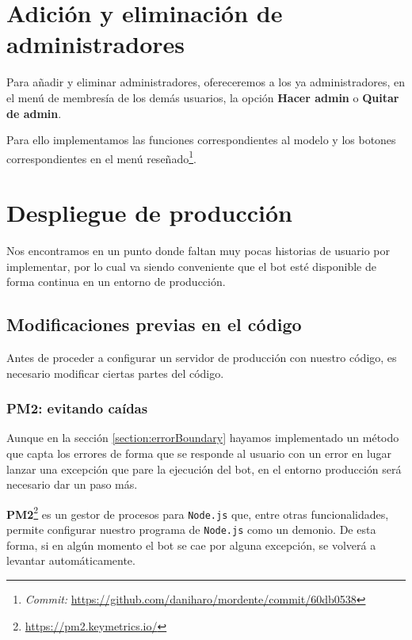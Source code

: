 \section{Adición y eliminación de administradores}

Para añadir y eliminar administradores, ofereceremos a los ya administradores, en el menú de membresía de los demás usuarios, la opción \textbf{Hacer admin} o \textbf{Quitar de admin}.

Para ello implementamos las funciones correspondientes al modelo y los botones correspondientes en el menú reseñado\footnote{\textit{Commit:} \url{https://github.com/daniharo/mordente/commit/60db0538}}.




\section{Despliegue de producción}

Nos encontramos en un punto donde faltan muy pocas historias de usuario por implementar, por lo cual va siendo conveniente que el bot esté disponible de forma continua en un entorno de producción.

\subsection{Modificaciones previas en el código}

Antes de proceder a configurar un servidor de producción con nuestro código, es necesario modificar ciertas partes del código.

\subsubsection{PM2: evitando caídas}

Aunque en la sección \ref{section:errorBoundary} hayamos implementado un método que capta los errores de forma que se responde al usuario con un error en lugar lanzar una excepción que pare la ejecución del bot, en el entorno producción será necesario dar un paso más.

\textbf{PM2}\footnote{\url{https://pm2.keymetrics.io/}} es un gestor de procesos para \texttt{Node.js} que, entre otras funcionalidades, permite configurar nuestro programa de \texttt{Node.js} como un demonio. De esta forma, si en algún momento el bot se cae por alguna excepción, se volverá a levantar automáticamente.

